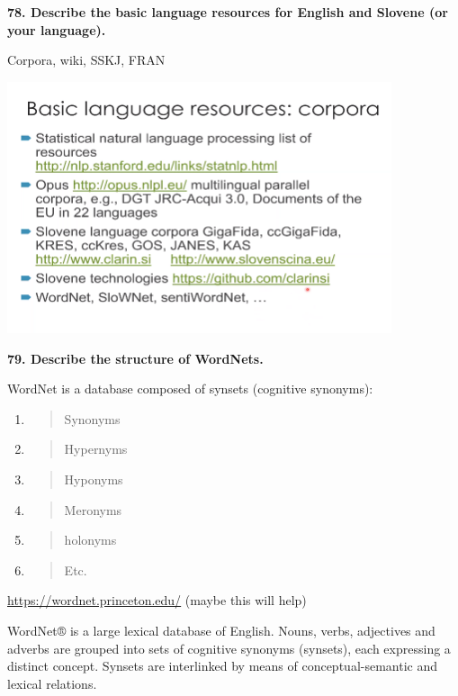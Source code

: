 \textbf{78. Describe the basic language resources for English and
Slovene (or your language).}

Corpora, wiki, SSKJ, FRAN

\includegraphics[width=4.45715in,height=2.90953in]{media/image16.png}

\textbf{79. Describe the structure of WordNets.}

WordNet is a database composed of synsets (cognitive synonyms):

\begin{enumerate}
\def\labelenumi{\arabic{enumi}.}
\item
  \begin{quote}
  Synonyms
  \end{quote}
\item
  \begin{quote}
  Hypernyms
  \end{quote}
\item
  \begin{quote}
  Hyponyms
  \end{quote}
\item
  \begin{quote}
  Meronyms
  \end{quote}
\item
  \begin{quote}
  holonyms
  \end{quote}
\item
  \begin{quote}
  Etc.
  \end{quote}
\end{enumerate}

\href{https://wordnet.princeton.edu/}{\underline{https://wordnet.princeton.edu/}}
(maybe this will help)

WordNet® is a large lexical database of English. Nouns, verbs,
adjectives and adverbs are grouped into sets of cognitive synonyms
(synsets), each expressing a distinct concept. Synsets are interlinked
by means of conceptual-semantic and lexical relations.

